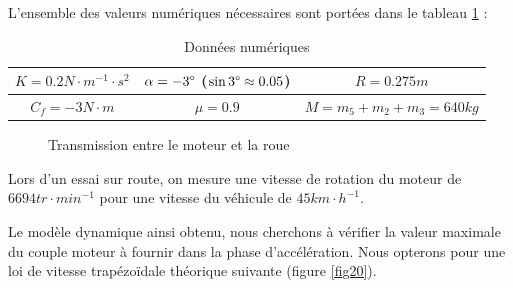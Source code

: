 L'ensemble des valeurs numériques nécessaires sont portées dans le tableau \ref{tab02} :

\begin{table}[!ht]
\begin{center}
\begin{tabular}{|c|c|c|}
\hline
$K = 0.2N\cdot m^{-1}\cdot s^2$ & $\alpha = -3\degree$ ($\sin 3\degree\approx 0.05$) & $R = 0.275m$ \\
\hline
$C_f = -3N\cdot m$ & $\mu = 0.9$ & $M = m_5 + m_2 + m_3 = 640kg$ \\
\hline
\end{tabular}
\caption{\label{tab02}Données numériques}
\end{center}
\end{table}

\begin{figure}[!ht]
\begin{center}
 \def\svgwidth{.5\linewidth}
 
\end{center}
\caption{\label{fig12}Transmission entre le moteur et la roue}
\end{figure}

\medskip
Lors d'un essai sur route, on mesure une vitesse de rotation du moteur de $6694tr\cdot min^{-1}$ pour une vitesse du véhicule de $45km\cdot h^{-1}$.





\medskip Le modèle dynamique ainsi obtenu, nous cherchons à vérifier la valeur maximale du couple moteur à fournir dans la phase d'accélération. Nous opterons pour une loi de vitesse trapézoïdale théorique suivante (figure \ref{fig20}).

